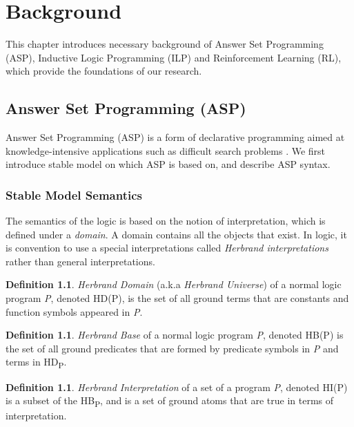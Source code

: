 \documentclass[12pt,twoside]{report}
\theoremstyle{plain}
\theoremstyle{definition}
\newtheorem{defn}[thm]{Definition} %
\begin{document}
\chapter{Background}
\label{background}

This chapter introduces necessary background of Answer Set Programming (ASP), Inductive Logic Programming (ILP) and Reinforcement Learning (RL), which provide the foundations of our research.

\section{Answer Set Programming (ASP)}
\label{sec:asp}
Answer Set Programming (ASP) is a form of declarative programming aimed at knowledge-intensive applications such as difficult search problems \cite{Lifschitz2008}. We first introduce stable model on which ASP is based on, and describe ASP syntax. 

\subsection{Stable Model Semantics}

The semantics of the logic is based on the notion of interpretation, which is defined under a \textit{domain}. A domain contains all the objects that exist. In logic, it is convention to use a special interpretations called \textit{Herbrand interpretations} rather than general interpretations.

\begin{defn}
\textit{Herbrand Domain} (a.k.a \textit{Herbrand Universe}) of a normal logic program \textit{P}, denoted HD(P), is the set of all ground terms that are constants and function symbols appeared in \textit{P}.
\end{defn}

\begin{defn}
\textit{Herbrand Base} of a normal logic program \textit{P}, denoted HB(P) is the set of all ground predicates that are formed by predicate symbols in \textit{P} and terms in HD\textsubscript{P}.
\end{defn}

\begin{defn}
\textit{Herbrand Interpretation} of a set of a program \textit{P}, denoted HI(P) is a subset of the HB\textsubscript{P}, and is a set of ground atoms that are true in terms of interpretation.
\end{defn}
\end{document}
